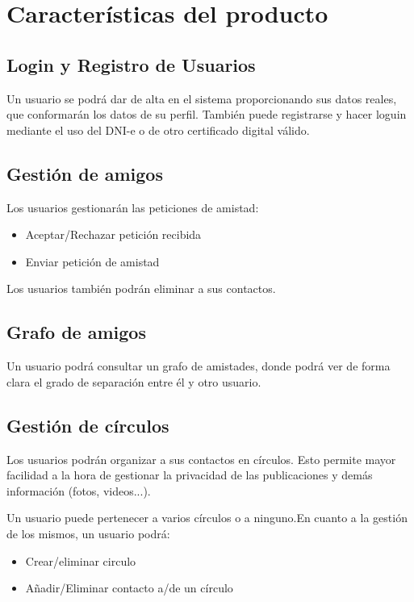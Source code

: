 \documentclass[12pt, a4paper, titlepage]{article}
\begin{document}
\section{Características del producto}

\subsection{Login y Registro de Usuarios}
Un usuario se podrá dar de alta en el sistema proporcionando sus datos reales, que conformarán los datos de su perfil. También puede registrarse y hacer loguin mediante el uso del DNI-e o de otro certificado digital válido.

\subsection{Gestión de amigos}
Los usuarios gestionarán las peticiones de amistad:
\begin{itemize}
\item Aceptar/Rechazar petición recibida
\item Enviar petición de amistad
\end{itemize}
Los usuarios también podrán eliminar a sus contactos. 
\subsection{Grafo de amigos}
Un usuario podrá consultar un grafo de amistades, donde podrá ver de forma clara el grado de separación entre él y otro usuario.

\subsection{Gestión de círculos}

Los usuarios podrán organizar a sus contactos en círculos. Esto permite mayor facilidad a la hora de gestionar la privacidad de las publicaciones y demás información (fotos, videos...).

Un usuario puede pertenecer a varios círculos o a ninguno.En cuanto a la gestión de los mismos, un usuario podrá:
\begin{itemize}
\item Crear/eliminar circulo
\item Añadir/Eliminar contacto a/de un círculo
\end{itemize}
\end{document}
